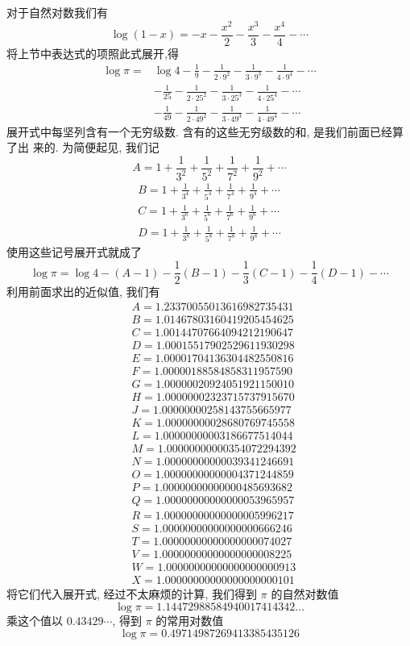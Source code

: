 对于自然对数我们有
\[
\log (1-x)=-x-\frac{x^{2}}{2}-\frac{x^{3}}{3}-\frac{x^{4}}{4}-\cdots
\]
将上节中表达式的项照此式展开,得
\[
\begin{aligned}
\log \pi= & \log 4-\frac{1}{9}-\frac{1}{2 \cdot 9^{2}}-\frac{1}{3 \cdot 9^{3}}-\frac{1}{4 \cdot 9^{4}}-\cdots \\
& -\frac{1}{25}-\frac{1}{2 \cdot 25^{2}}-\frac{1}{3 \cdot 25^{3}}-\frac{1}{4 \cdot 25^{4}}-\cdots \\
& -\frac{1}{49}-\frac{1}{2 \cdot 49^{2}}-\frac{1}{3 \cdot 49^{3}}-\frac{1}{4 \cdot 49^{4}}-\cdots
\end{aligned}
\]
展开式中每坚列含有一个无穷级数. 含有的这些无穷级数的和, 是我们前面已经算了出 来的. 为简便起见, 我们记
\[
A=1+\frac{1}{3^{2}}+\frac{1}{5^{2}}+\frac{1}{7^{2}}+\frac{1}{9^{2}}+\cdots
\]
\[
\begin{gathered}
B=1+\frac{1}{3^{4}}+\frac{1}{5^{4}}+\frac{1}{7^{4}}+\frac{1}{9^{4}}+\cdots \\
C=1+\frac{1}{3^{6}}+\frac{1}{5^{6}}+\frac{1}{7^{6}}+\frac{1}{9^{6}}+\cdots \\
D=1+\frac{1}{3^{8}}+\frac{1}{5^{8}}+\frac{1}{7^{8}}+\frac{1}{9^{8}}+\cdots
\end{gathered}
\]
使用这些记号展开式就成了
\[
\log \pi=\log 4-(A-1)-\frac{1}{2}(B-1)-\frac{1}{3}(C-1)-\frac{1}{4}(D-1)-\cdots
\]
利用前面求出的近似值, 我们有
\[
\begin{aligned}
& A=1.23370055013616982735431 \\
& B=1.01467803160419205454625 \\
& C=1.00144707664094212190647 \\
& D=1.00015517902529611930298 \\
& E=1.00001704136304482550816 \\
& F=1.00000188584858311957590 \\
& G=1.00000020924051921150010 \\
& H=1.00000002323715737915670 \\
& J=1.00000000258143755665977 \\
& K=1.00000000028680769745558 \\
& L=1.00000000003186677514044 \\
& M=1.00000000000354072294392 \\
& N=1.00000000000039341246691 \\
& O=1.00000000000004371244859 \\
& P=1.00000000000000485693682 \\
& Q=1.00000000000000053965957 \\
& R=1.00000000000000005996217 \\
& S=1.00000000000000000666246 \\
& T=1.00000000000000000074027 \\
& V=1.00000000000000000008225 \\
& W=1.00000000000000000000913 \\
& X=1.00000000000000000000101
\end{aligned}
\]
将它们代入展开式, 经过不太麻烦的计算, 我们得到 $\pi$ 的自然对数值
\[
\log \pi=1.14472988584940017414342 \ldots
\]
乘这个值以 $0.43429 \cdots$, 得到 $\pi$ 的常用对数值
\[
\log \pi=0.49714987269413385435126
\]
